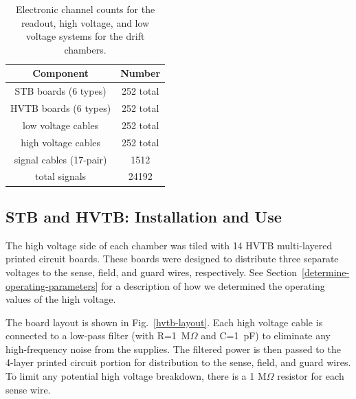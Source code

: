 \begin{table}[htbp]
\begin{center}
\begin{tabular} {||c|c||} \hline \hline
{\bf Component}           & {\bf Number} \\ \hline
STB boards (6 types)      & 252 total \\ \hline
HVTB boards (6 types)     & 252 total \\ \hline
low voltage cables        & 252 total  \\ \hline
high voltage cables       & 252 total  \\ \hline
signal cables (17-pair)   & 1512 \\ \hline
total signals             & 24192 \\ \hline \hline
\end{tabular}
\caption{\small{Electronic channel counts for the readout, high voltage,
and low voltage systems for the drift chambers.}}
\label{electronic-components}
\end{center}
\end{table}

\subsection{STB and HVTB: Installation and Use}
\label{stb-hvtb-installation}

The high voltage side of each chamber was tiled with 14 HVTB multi-layered printed circuit 
boards. These boards were designed to distribute three
separate voltages to the sense, field, and guard wires, respectively.  See
Section~\ref{determine-operating-parameters} for a 
description of how we determined the operating values of the high voltage.

The board layout is shown in Fig.~\ref{hvtb-layout}.
Each high voltage cable is connected to a low-pass filter (with R=1~M$\Omega$ and C=1~pF) to 
eliminate any high-frequency noise from the supplies.
The filtered power is then passed to the 4-layer printed circuit
portion for distribution to the sense, field, and guard wires.
To limit any potential high voltage breakdown, there is a 1 M$\Omega$
resistor for each sense wire.

